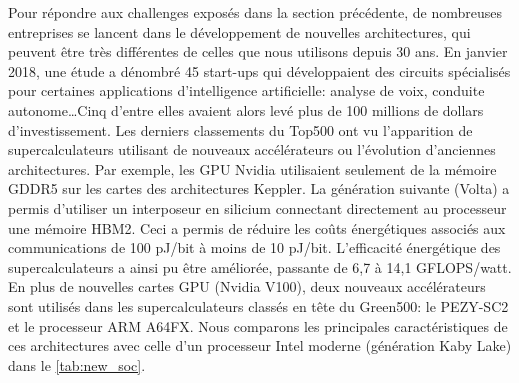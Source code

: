         Pour répondre aux challenges exposés dans la section précédente, de nombreuses entreprises se lancent dans le développement de nouvelles architectures, qui peuvent être très différentes de celles que nous utilisons depuis 30 ans. En janvier 2018, une étude \cite{Metz2018} a dénombré 45 start-ups qui développaient des circuits spécialisés pour certaines applications d’intelligence artificielle: analyse de voix, conduite autonome\ldots Cinq  d’entre elles avaient alors levé plus de 100 millions de dollars d’investissement. Les derniers classements du Top500 ont vu l'apparition de supercalculateurs utilisant de nouveaux accélérateurs ou l'évolution d'anciennes architectures. Par exemple, les GPU Nvidia utilisaient seulement de la mémoire GDDR5 sur les cartes des architectures Keppler. La génération suivante (Volta) a permis d'utiliser un interposeur en silicium connectant directement au processeur une mémoire HBM2. Ceci a permis de réduire les coûts énergétiques associés aux communications de 100 pJ/bit à moins de 10 pJ/bit. L'efficacité énergétique des supercalculateurs a ainsi pu être améliorée, passante de 6,7 à 14,1 GFLOPS/watt. En plus de nouvelles cartes GPU (Nvidia V100), deux nouveaux accélérateurs sont utilisés dans les supercalculateurs classés en tête du Green500: le PEZY-SC2 et le processeur ARM A64FX. Nous comparons les principales caractéristiques de ces architectures avec celle d'un processeur Intel moderne (génération Kaby Lake) dans le \autoref{tab:new_soc}.
        
                
        \begin{table}[]
        \centering
        \caption{Caractéristiques et performances d'architectures utilisées dans les supercalculateurs les plus efficaces du Top500.}
        \label{tab:new_soc}
        \end{table}
                
